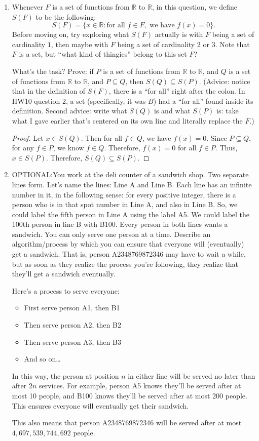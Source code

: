 \documentclass{article}
\begin{document}
\begin{enumerate}
\newpage

\item Whenever $F$ is a set of functions from $\mathbb{R}$ to $\mathbb{R}$, in this question, we define $S(F)$ to be the following:
\[ S(F) = \{x \in \mathbb{R} : \text{for all } f \in F, \text{ we have } f(x)=0\}. \]
Before moving on, try exploring what $S(F)$ actually is with $F$ being a set of cardinality $1$, then maybe with $F$ being a set of cardinality $2$ or $3$. Note that $F$ is a set, but ``what kind of thingies'' belong to this set $F$?

What's the task? Prove: if $P$ is a set of functions from  $\mathbb{R}$ to $\mathbb{R}$, and $Q$ is a set of functions from $\mathbb{R}$ to $\mathbb{R}$, and $P \subseteq Q$, then $S(Q) \subseteq S(P)$. (Advice: notice that in the definition of $S(F)$, there is a ``for all'' right after the colon. In HW10 question 2, a set (specifically, it was $B$) had a ``for all'' found inside its definition. Second advice: write what $S(Q)$ is and what $S(P)$ is: take what I gave earlier that's centered on its own line and literally replace the $F$.)

\begin{proof}
    Let $x \in S(Q)$.
    Then for all $f \in Q$, we have $f(x)=0$.
    Since $P \subseteq Q$, for any $f \in P$, we know $f \in Q$.
    Therefore, $f(x)=0$ for all $f \in P$.
    Thus, $x \in S(P)$.
    Therefore, $S(Q) \subseteq S(P)$.
\end{proof}

\newpage

\item OPTIONAL:\@ You work at the deli counter of a sandwich shop. Two separate lines form. Let's name the lines: Line A and Line B. Each line has an infinite number in it, in the following sense: for every positive integer, there is a person who is in that spot number in Line A, and also in Line B. So, we could label the fifth person in Line A using the label A5. We could label the 100th person in line B with B100. Every person in both lines wants a sandwich. You can only serve one person at a time. Describe an algorithm/process by which you can ensure that everyone will (eventually) get a sandwich. That is, person A2348769872346 may have to wait a while, but as soon as they realize the process you're following, they realize that they'll get a sandwich eventually.

Here's a process to serve everyone:
\begin{itemize}[label=$\circ$]
    \item First serve person A1, then B1
    \item Then serve person A2, then B2
    \item Then serve person A3, then B3
    \item And so on\ldots
\end{itemize}
In this way, the person at position $n$ in either line will be served no later than after $2n$ services. 
For example, person A5 knows they'll be served after at most 10 people, and B100 knows they'll be served after at most 200 people.
This ensures everyone will eventually get their sandwich.

This also means that person A2348769872346 will be served after at most $4,697,539,744,692$ people.

\end{enumerate}
\end{document}

